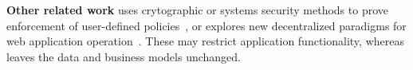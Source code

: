 \textbf{Other related work} uses crytographic or systems security methods to
prove enforcement of user-defined policies~\cite{zeph, riverbed,
vanish}, or explores
new decentralized paradigms for web application operation~\cite{solid, bstore,
databox, diy, amber, oort, w5, blockstack}.  These may restrict application
functionality, whereas \sys leaves the data and business models unchanged.
%
%
%
%
%
